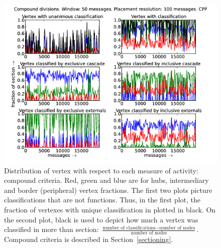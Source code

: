 \documentclass[%
 aip,
 jmp,%
 amsmath,amssymb,
 reprint,%
]{revtex4-1}
\begin{document}
\begin{figure}[hbtp] 
   \centering
        \includegraphics[width=\textwidth]{figs/CPP/50_2}
    \caption{Distribution of vertex with respect to each measure of activity: compound criteria. Red, green and blue are for hubs, intermediary and border (peripheral) vertex fractions. The first two plots picture classifications that are not functions. Thus, in the first plot, the fraction of vertexes with unique classification in plotted in black. On the second plot, black is used to depict how much a vertex was classified in more than section: $\frac{\text{number of classifications} - \text{number of nodes}}{\text{number of nodes}}$. Compound criteria is described in Section~\ref{sectioning}.}
    \label{fig:cpp50_}
\end{figure}
\end{document}
